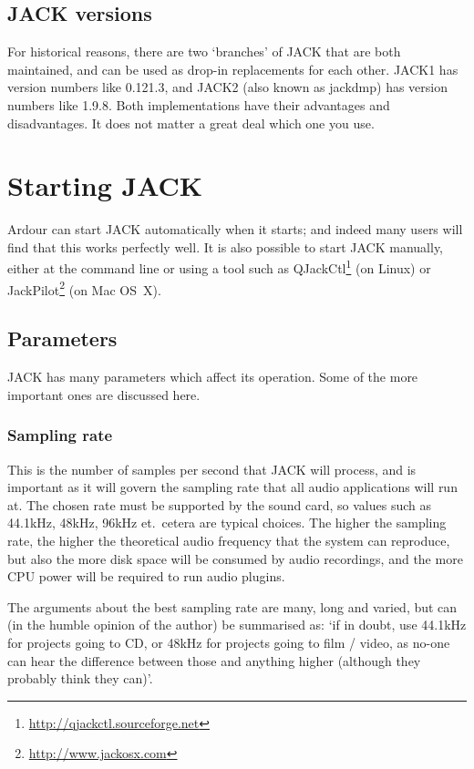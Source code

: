 \documentclass[10pt,a4paper]{book}
\begin{document}
\subsection{JACK versions}

For historical reasons, there are two `branches' of JACK that are both
maintained, and can be used as drop-in replacements for each other.
JACK1 has version numbers like 0.121.3, and JACK2 (also known as
jackdmp) has version numbers like 1.9.8.  Both implementations have
their advantages and disadvantages.  It does not matter a great deal
which one you use.

\section{Starting JACK}

Ardour can start JACK automatically when it starts; and indeed many
users will find that this works perfectly well.  It is also possible
to start JACK manually, either at the command line or using a tool
such as QJackCtl\footnote{\url{http://qjackctl.sourceforge.net}} (on
Linux) or JackPilot\footnote{\url{http://www.jackosx.com}} (on Mac
OS~X).

\subsection{Parameters}

JACK has many parameters which affect its operation.  Some of the more
important ones are discussed here.

\subsubsection{Sampling rate}

This is the number of samples per second that JACK will process, and
is important as it will govern the sampling rate that all audio
applications will run at.  The chosen rate must be supported
by the sound card, so values such as 44.1kHz, 48kHz, 96kHz
et.\ cetera are typical choices.  The higher the sampling rate, the
higher the theoretical audio frequency that the system can reproduce,
but also the more disk space will be consumed by audio recordings, and
the more CPU power will be required to run audio plugins.

The arguments about the best sampling rate are many, long and varied,
but can (in the humble opinion of the author) be summarised as: `if in
doubt, use 44.1kHz for projects going to CD, or 48kHz for projects
going to film / video, as no-one can hear the difference between those
and anything higher (although they probably think they can)'.
\end{document}
